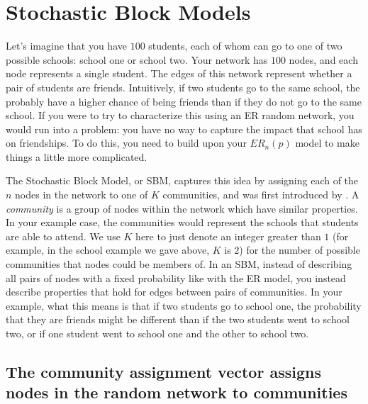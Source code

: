 \section{Stochastic Block Models}
\label{sec:ch5:sbm}

Let's imagine that you have $100$ students, each of whom can go to one of two possible schools: school one or school two. Your network has $100$ nodes, and each node represents a single student. The edges of this network represent whether a pair of students are friends. Intuitively, if two students go to the same school, the probably have a higher chance of being friends than if they do not go to the same school. If you were to try to characterize this using an ER random network, you would run into a problem: you have no way to capture the impact that school has on friendships. To do this, you need to build upon your $ER_n(p)$ model to make things a little more complicated.

The Stochastic Block Model, or SBM, captures this idea by assigning each of the $n$ nodes in the network to one of $K$ communities, and was first introduced by \cite{Holland1983Jun}. A \textit{community} is a group of nodes within the network which have similar properties. In your example case, the communities would represent the schools that students are able to attend. We use $K$ here to just denote an integer greater than $1$ (for example, in the school example we gave above, $K$ is $2$) for the number of {possible} communities that nodes could be members of. In an SBM, instead of describing all pairs of nodes with a fixed probability like with the ER model, you instead describe properties that hold for edges between {pairs of communities}. In your example, what this means is that if two students go to school one, the probability that they are friends might be different than if the two students went to school two, or if one student went to school one and the other to school two.

\subsection{The community assignment vector assigns nodes in the random network to communities}

